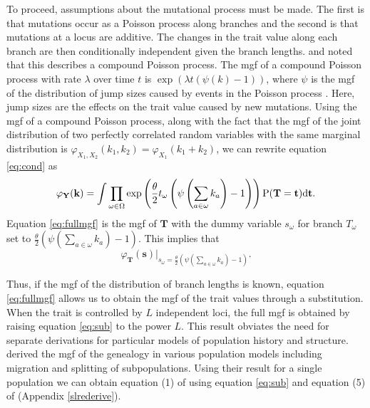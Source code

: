 To proceed, assumptions about the mutational process must be made. The first is
that mutations occur as a Poisson process along branches and the second is that
mutations at a locus are additive. The changes in the trait value along each
branch are then conditionally independent given the branch
lengths. \citet{Khaitovich2005} and \citet{Schraiber2015} noted that this
describes a compound Poisson process. The mgf of a compound Poisson process with
rate $\lambda$ over time $t$ is $\exp(\lambda t (\psi(k)-1))$, where $\psi$ is
the mgf of the distribution of jump sizes caused by events in the Poisson
process \citep{kingman-poisson-processes}. Here, jump sizes are the effects on
the trait value caused by new mutations. Using the mgf of a compound Poisson
process, along with the fact that the mgf of the joint distribution of two
perfectly correlated random variables with the same marginal distribution is
$\varphi_{X_1,X_2}(k_1,k_2)=\varphi_{X_1}(k_1+k_2)$, we can rewrite
equation \eqref{eq:cond} as
\begin{equation}
  \label{eq:fullmgf}
  \varphi_{\mathbf{Y}}(\mathbf{k}) = 
  \int \prod_{\omega \in \Omega} \exp\left( \frac{\theta}{2} t_{\omega} \left( \psi\left(\sum_{a \in \omega}k_{a}\right) -1 \right)\right)
  \mathrm{P}(\mathbf{T}=\mathbf{t})\mbox{d}\mathbf{t}.
\end{equation}
Equation \eqref{eq:fullmgf} is the mgf of $\mathbf{T}$ with the dummy variable
$s_{\omega}$ for branch $T_\omega$ set to
$\frac{\theta}{2} \left( \psi(\sum_{a \in \omega}k_{a}) -1 \right)$. This
implies that
\begin{equation}
  \label{eq:sub}
  \varphi_{\mathbf{T}}(\mathbf{s})\Bigr|_{s_{\omega}=\frac{\theta}{2} \left( \psi\left(\sum_{a \in \omega}k_{a}\right) -1 \right)}.
\end{equation}

Thus, if the mgf of the distribution of branch lengths is known, equation
\eqref{eq:fullmgf} allows us to obtain the mgf of the trait values through a
substitution. When the trait is controlled by $L$ independent loci, the full mgf
is obtained by raising equation \eqref{eq:sub} to the power $L$. This result
obviates the need for separate derivations for particular models of population
history and structure.
\citet{Lohse2011} derived the mgf of the genealogy in various population models
including migration and splitting of subpopulations. Using their result for a
single population we can obtain equation (1) of \citet{Schraiber2015} using
equation \eqref{eq:sub} and equation (5) of \citet{Lohse2011}
(Appendix \ref{slrederive}). 

